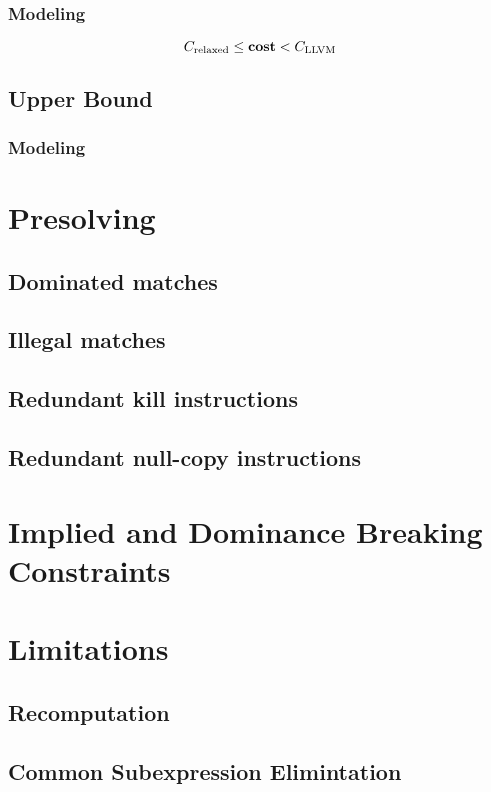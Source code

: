\subsubsection{Modeling}

\begin{equation}
  \mRelaxedCost \leq \mVar{cost} < \mLlvmCost
  \labelEquation{bounds}
\end{equation}

\subsection{Upper Bound}
\subsubsection{Modeling}

\section{Presolving}
\subsection{Dominated matches}
\subsection{Illegal matches}
\subsection{Redundant kill instructions}
\subsection{Redundant null-copy instructions}

\section{Implied and Dominance Breaking Constraints}

\section{Limitations}
\subsection{Recomputation}
\subsection{Common Subexpression Elimintation}
